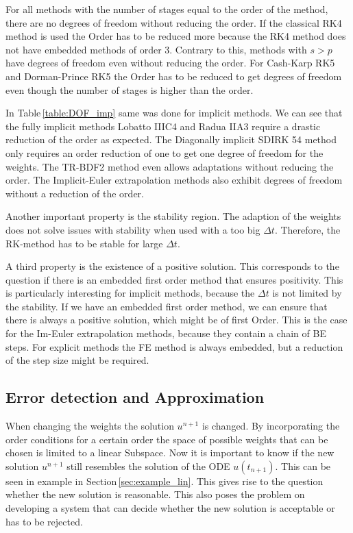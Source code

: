 \documentclass[a4paper]{article}
\numberwithin{equation}{section}
\theoremstyle{plain}
\theoremstyle{definition}
\numberwithin{theorem}{section}
\newcommand{\dt}{{\Delta t}}
\newcommand{\1}{\mathbbm{1}}
\begin{document}
For all methods with the number of stages equal to the order of the method, there are no degrees of freedom without reducing the order.  
If the classical RK4 method is used the Order has to be reduced more because the RK4 method does not have embedded methods of order 3. 
Contrary to this, methods with $s > p$ have degrees of freedom even without reducing the order.  
For Cash-Karp RK5 and Dorman-Prince RK5 the Order has to be reduced to get degrees of freedom even though the number of stages is higher than the order. 

 
In Table\,\ref{table:DOF_imp} same was done for implicit methods. 
We can see that the fully implicit methods Lobatto IIIC4 and Radua IIA3 require a drastic reduction of the order as expected. 
The Diagonally implicit SDIRK 54 method only requires an order reduction of one to get one degree of freedom for the weights.  
The TR-BDF2 method even allows adaptations without reducing the order.  
The Implicit-Euler extrapolation methods also exhibit degrees of freedom without a reduction of the order. 

Another important property is the stability region. 
The adaption of the weights does not solve issues with stability when used with a too big $\dt$. Therefore, the RK-method has to be stable for large $\dt$. 


A third property is the existence of a positive solution. This corresponds to the question if there is an embedded first order method that ensures positivity. This is particularly interesting for implicit methods, because the $\dt$ is not limited by the stability.  
If we have an embedded first order method, we can ensure that there is always a positive solution, which might be of first Order.  
This is the case for the Im-Euler extrapolation methods, because they contain a chain of BE steps. 
For explicit methods the FE method is always embedded, but a reduction of the step size might be required. 

\subsection{Error detection and Approximation}
When changing the weights the solution $u^{n+1}$ is changed. 
By incorporating the order conditions for a certain order the space of possible weights that can be chosen is limited to a linear Subspace. 
Now it is important to know if the new solution $u^{n+1}$ still resembles the solution of the ODE $u(t_{n+1})$. 
This can be seen in example in Section\,\ref{sec:example_lin}. 
This gives rise to the question whether the new solution is reasonable.
This also poses the problem on developing a system that can decide whether the new solution is acceptable or has to be rejected.
 
\end{document}
